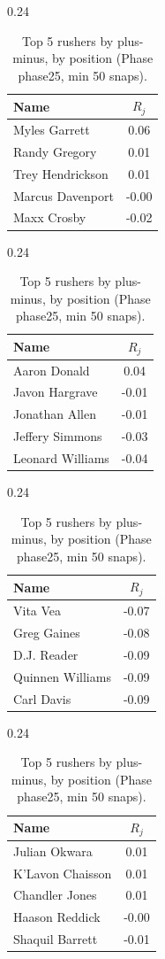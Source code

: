 \begin{table}[h!]
\centering
\begin{subtable}{0.24\textwidth}
\centering
\footnotesize
\begin{tabular}{lc}
\toprule
Name & $R_j$ \\
\midrule
Myles Garrett & 0.06 \\
Randy Gregory & 0.01 \\
Trey Hendrickson & 0.01 \\
Marcus Davenport & -0.00 \\
Maxx Crosby & -0.02 \\
\bottomrule
\end{tabular}
\caption{DE}
\end{subtable}
\hfill
\begin{subtable}{0.24\textwidth}
\centering
\footnotesize
\begin{tabular}{lc}
\toprule
Name & $R_j$ \\
\midrule
Aaron Donald & 0.04 \\
Javon Hargrave & -0.01 \\
Jonathan Allen & -0.01 \\
Jeffery Simmons & -0.03 \\
Leonard Williams & -0.04 \\
\bottomrule
\end{tabular}
\caption{DT}
\end{subtable}
\hfill
\begin{subtable}{0.24\textwidth}
\centering
\footnotesize
\begin{tabular}{lc}
\toprule
Name & $R_j$ \\
\midrule
Vita Vea & -0.07 \\
Greg Gaines & -0.08 \\
D.J. Reader & -0.09 \\
Quinnen Williams & -0.09 \\
Carl Davis & -0.09 \\
\bottomrule
\end{tabular}
\caption{NT}
\end{subtable}
\hfill
\begin{subtable}{0.24\textwidth}
\centering
\footnotesize
\begin{tabular}{lc}
\toprule
Name & $R_j$ \\
\midrule
Julian Okwara & 0.01 \\
K'Lavon Chaisson & 0.01 \\
Chandler Jones & 0.01 \\
Haason Reddick & -0.00 \\
Shaquil Barrett & -0.01 \\
\bottomrule
\end{tabular}
\caption{OLB}
\end{subtable}
\caption{Top 5 rushers by plus-minus, by position (Phase phase25, min 50 snaps).}
\label{tab:rusher_pm_phase25_top}
\end{table}

